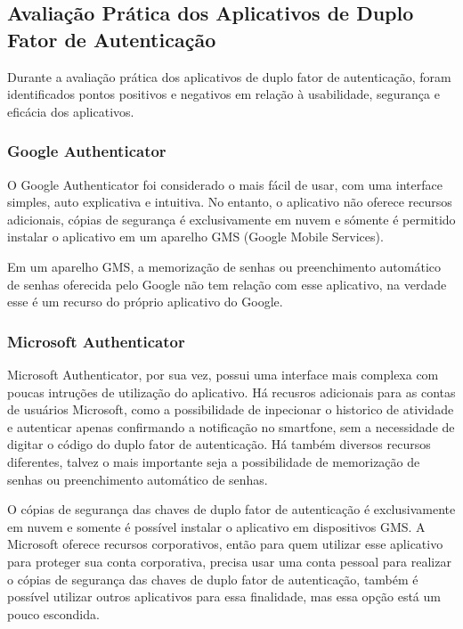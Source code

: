 \documentclass[12pt]{article}
\begin{document}
\subsection{Avaliação Prática dos Aplicativos de Duplo Fator de Autenticação}

Durante a avaliação prática dos aplicativos de duplo fator de autenticação,
foram identificados pontos positivos e negativos em relação à usabilidade,
segurança e eficácia dos aplicativos.

\subsubsection{Google Authenticator}

O Google Authenticator foi considerado o mais fácil de usar, com uma
interface simples, auto explicativa e intuitiva.
No entanto, o aplicativo não oferece recursos adicionais, cópias de segurança
é exclusivamente em nuvem e sómente é permitido instalar o aplicativo em um
aparelho GMS (Google Mobile Services).

Em um aparelho GMS, a memorização de senhas ou preenchimento automático de
senhas oferecida pelo Google não tem relação com esse aplicativo, na verdade
esse é um recurso do próprio aplicativo do Google.

\subsubsection{Microsoft Authenticator}\label{sec:figs}

Microsoft Authenticator, por sua vez, possui uma interface mais complexa com
poucas intruções de utilização do aplicativo.
Há recusros adicionais para as contas de usuários Microsoft, como a possibilidade de
inpecionar o historico de atividade e autenticar apenas confirmando a notificação
no smartfone, sem a necessidade de digitar o código do duplo fator de autenticação.
Há também diversos recursos diferentes, talvez o mais importante seja a possibilidade
de memorização de senhas ou preenchimento automático de senhas.

O cópias de segurança das chaves de duplo fator de autenticação é exclusivamente em
nuvem e somente é possível instalar o aplicativo em dispositivos GMS.
A Microsoft oferece recursos corporativos, então para quem utilizar esse
aplicativo para proteger sua conta corporativa, precisa usar uma conta pessoal
para realizar o cópias de segurança das chaves de duplo fator de autenticação, também
é possível utilizar outros aplicativos para essa finalidade, mas essa opção está um
pouco escondida.
\end{document}
